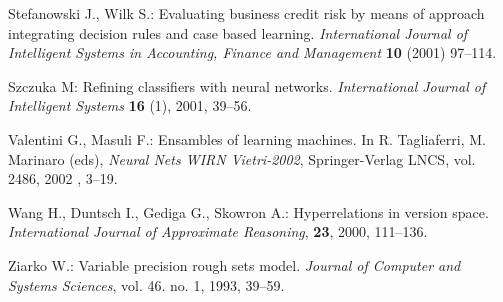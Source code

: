 \documentclass{llncs}
\begin{document}
\begin{thebibliography}{17}
 Stefanowski J., Wilk S.: Evaluating business credit risk by
means of approach integrating decision rules and case based learning.
\emph{International Journal of Intelligent Systems in Accounting, Finance
and Management} \textbf{10} (2001) 97--114.

 Szczuka M: Refining classifiers with neural networks.
\emph{International
Journal of Intelligent Systems} \textbf{16} (1), 2001, 39--56.


 Valentini G., Masuli F.: Ensambles of learning
machines. In R. Tagliaferri, M. Marinaro (eds), \emph{Neural Nets WIRN
Vietri-2002}, Springer-Verlag LNCS, vol. 2486, 2002 , 3--19.

 Wang H., Duntsch I., Gediga G., Skowron A.: Hyperrelations
in version space. {\em International Journal of Approximate Reasoning},
\textbf{23}, 2000, 111--136.


 Ziarko W.:  Variable precision rough sets model.
{\em Journal of Computer and Systems Sciences}, vol. 46. no. 1, 1993,
39--59.


\end{thebibliography}
\end{document}
